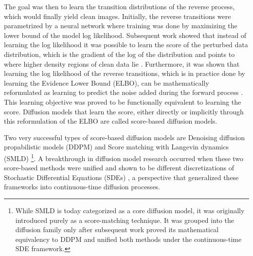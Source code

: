 The goal was then to learn the transition distributions of the reverse process, which would finally yield clean images. Initially, the reverse transitions were parametrized by a neural network where training was done by maximizing the lower bound of the model log likelihood. Subsequent work showed that instead of learning the log likelihood it was possible to learn the score of the perturbed data distribution, which is the gradient of the log of the distribution and points to where higher density regions of clean data lie \cite{song2020generativemodelingestimatinggradients}. Furthermore, it was shown that learning the log likelihood of the reverse transitions, which is in practice done by learning the Evidence Lower Bound (ELBO), can be mathematically reformulated as learning to predict the noise added during the forward process \cite{ho2020denoisingdiffusionprobabilisticmodels}. This learning objective was proved to be functionally equivalent to learning the score. Diffusion models that learn the score, either directly or implicitly through this reformulation of the ELBO are called score-based diffusion models.

 Two very successful types of score-based diffusion models are Denoising diffusion propabilistic models (DDPM) \cite{ho2020denoisingdiffusionprobabilisticmodels} and Score matching with Langevin dynamics (SMLD) \cite{song2020generativemodelingestimatinggradients}\footnote{While SMLD is today categorized as a core diffusion model, it was originally introduced purely as a score-matching technique. It was grouped into the diffusion family only after subsequent work proved its mathematical equivalency to DDPM and unified both methods under the continuous-time SDE framework.}. A breakthrough in diffusion model research occurred when these two score-based methods were unified and shown to be different discretizations of Stochastic Differential Equations (SDEs) \cite{song2021scorebasedgenerativemodelingstochastic}, a perspective that generalized these frameworks into continuous-time diffusion processes.

